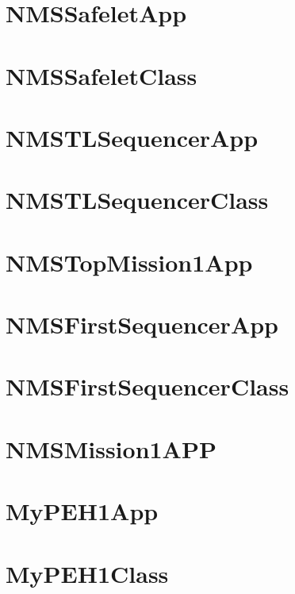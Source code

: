 \documentclass{article}
\begin{document}
\section{NMSSafeletApp}

\newpage

\section{NMSSafeletClass}

\newpage

\section{NMSTLSequencerApp}

\newpage

\section{NMSTLSequencerClass}

\newpage

\section{NMSTopMission1App}

\newpage

\section{NMSFirstSequencerApp}

\newpage

\section{NMSFirstSequencerClass}

\newpage

\section{NMSMission1APP}

\newpage

\section{MyPEH1App}

\newpage

\section{MyPEH1Class}

\newpage
\end{document}
